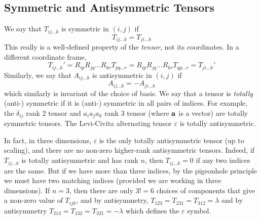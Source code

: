 \subsection{Symmetric and Antisymmetric Tensors}
We say that \(T_{ij\dots k}\) is symmetric in \((i, j)\) if
\[
	T_{ij\dots k} = T_{ji\dots k}
\]
This really is a well-defined property of the \textit{tensor}, not its coordinates.
In a different coordinate frame,
\[
	T_{ij\dots k}' = R_{ip}R_{jq}\dots R_{kr} T_{pq\dots r} = R_{ip}R_{jq}\dots R_{kr} T_{qp\dots r} = T_{ji\dots k}'
\]
Similarly, we say that \(A_{ij\dots k}\) is antisymmetric in \((i, j)\) if
\[
	A_{ij\dots k} = -A_{ji\dots k}
\]
which similarly is invariant of the choice of basis.
We say that a tensor is \textit{totally} (anti-) symmetric if it is (anti-) symmetric in all pairs of indices.
For example, the \(\delta_{ij}\) rank 2 tensor and \(a_i a_j a_k\) rank 3 tensor (where \(\vb a\) is a vector) are totally symmetric tensors.
The Levi-Civita alternating tensor \(\varepsilon\) is totally antisymmetric.

In fact, in three dimensions, \(\varepsilon\) is the only totally antisymmetric tensor (up to scaling), and there are no non-zero higher-rank antisymmetric tensors.
Indeed, if \(T_{ij\dots k}\) is totally antisymmetric and has rank \(n\), then \(T_{ij\dots k} = 0\) if any two indices are the same.
But if we have more than three indices, by the pigeonhole principle we must have two matching indices (provided we are working in three dimensions).
If \(n=3\), then there are only \(3! = 6\) choices of components that give a non-zero value of \(T_{ijk}\), and by antisymmetry, \(T_{123} = T_{231} = T_{312} = \lambda\) and by antisymmetry \(T_{213} = T_{132} = T_{321} = -\lambda\) which defines the \(\varepsilon\) symbol.

